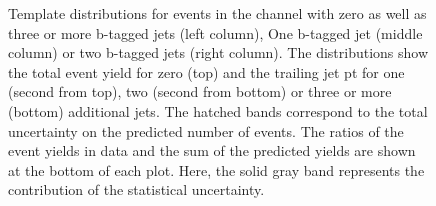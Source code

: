 \begin{figure}[htbp!]
\begin{center}
\caption{Template distributions for events in the \emu channel with zero as well as three or
  more b-tagged jets (left column), One b-tagged jet (middle column) or two b-tagged jets (right column). The distributions show the total event yield for zero (top) and the trailing jet pt for one (second from top),
  two (second from bottom) or three or more (bottom) additional jets. 
  The hatched bands correspond to the total uncertainty on the predicted number of events. The ratios of the event yields in data and the sum of the
  predicted yields are shown at the bottom of each plot. Here, the solid
  gray band represents the contribution of the statistical uncertainty.  
       \label{fig:xsec_emu_inputdistr}}
  \end{center}
\end{figure}

